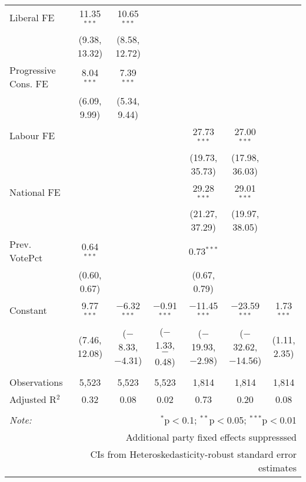 \begin{table}[!htb]
\begin{tabular}{@{\extracolsep{5pt}}lcccccc}
  Liberal FE & 11.35$^{***}$ & 10.65$^{***}$ &  &  &  &  \\ 
  & (9.38, 13.32) & (8.58, 12.72) &  &  &  &  \\ 
  Progressive Cons. FE & 8.04$^{***}$ & 7.39$^{***}$ &  &  &  &  \\ 
  & (6.09, 9.99) & (5.34, 9.44) &  &  &  &  \\ 
  Labour FE &  &  &  & 27.73$^{***}$ & 27.00$^{***}$ &  \\ 
  &  &  &  & (19.73, 35.73) & (17.98, 36.03) &  \\ 
  National FE &  &  &  & 29.28$^{***}$ & 29.01$^{***}$ &  \\ 
  &  &  &  & (21.27, 37.29) & (19.97, 38.05) &  \\ 
  Prev. VotePct & 0.64$^{***}$ &  &  & 0.73$^{***}$ &  &  \\ 
  & (0.60, 0.67) &  &  & (0.67, 0.79) &  &  \\ 
  Constant & 9.77$^{***}$ & $-$6.32$^{***}$ & $-$0.91$^{***}$ & $-$11.45$^{***}$ & $-$23.59$^{***}$ & 1.73$^{***}$ \\ 
  & (7.46, 12.08) & ($-$8.33, $-$4.31) & ($-$1.33, $-$0.48) & ($-$19.93, $-$2.98) & ($-$32.62, $-$14.56) & (1.11, 2.35) \\ 
 \hline \\[-1.8ex] 
Observations & 5,523 & 5,523 & 5,523 & 1,814 & 1,814 & 1,814 \\ 
Adjusted R$^{2}$ & 0.32 & 0.08 & 0.02 & 0.73 & 0.20 & 0.08 \\ 
\hline 
\hline \\[-1.8ex] 
\textit{Note:}  & \multicolumn{6}{r}{$^{*}$p$<$0.1; $^{**}$p$<$0.05; $^{***}$p$<$0.01} \\ 
 & \multicolumn{6}{r}{Additional party fixed effects suppresssed} \\ 
 & \multicolumn{6}{r}{CIs from Heteroskedasticity-robust standard error estimates} \\ 
\end{tabular} 
\end{table} 
